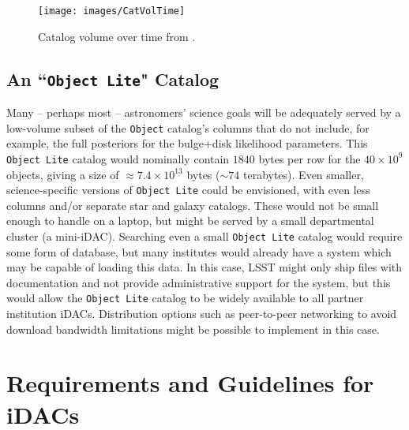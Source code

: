 \begin{figure}
\begin{center}
\texttt{[image: images/CatVolTime]}
\caption{Catalog volume over time from . \label{fig:catvol}}
\end{center}
\end{figure}

\subsection{An ``{\tt Object Lite}" Catalog}

Many -- perhaps most -- astronomers' science goals will be adequately served by a low-volume subset of the {\tt Object} catalog's columns that do not include, for example, the full posteriors for the bulge+disk likelihood parameters. This {\tt Object Lite} catalog would nominally contain $1840$ bytes per row for the $40 \times 10^{9}$ objects, giving a size of $\approx 7.4 \times 10^{13}$ bytes ($\sim74$ terabytes). Even smaller, science-specific versions of {\tt Object Lite} could be envisioned, with even less columns and/or separate star and galaxy catalogs. These would not be small enough to handle on a laptop, but might be served by a small departmental cluster (a mini-iDAC). Searching even a small {\tt Object Lite} catalog would require some form of database, but many institutes would already have a system which may be capable of loading this data. In this case, LSST might only ship files with documentation and not provide administrative support for the system, but this would allow the {\tt Object Lite} catalog to be widely available to all partner institution iDACs. Distribution options such as peer-to-peer networking to avoid download bandwidth limitations might be possible to implement in this case.


\section{Requirements and Guidelines for iDACs}\label{sec:reqs}

